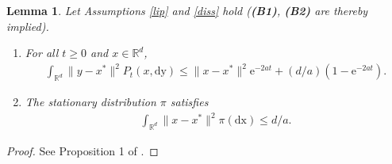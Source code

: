 \documentclass[a4paper]{article}
\newtheorem{lemma}[theorem]{Lemma}
\def\e{\text{e}}
\def\Rd{\mathbb{R}^{d}}
\begin{document}
\begin{lemma}\label{prop2}
	Let Assumptions \ref{lip} and \ref{diss} hold ({\bf (B1)}, {\bf (B2)} are thereby implied).
	\begin{enumerate}
		\item[(i)] For all $t\geq 0$ and $x \in \Rd$,
		\begin{align*}
		\int_{\Rd}\|y-x^*\|^2P_t(x,\mathrm{dy})\leq \|x-x^*\|^2 \e^{-2at}+(d/a)(1-\e^{-2at}).
		\end{align*}
		\item[(ii)] The stationary distribution $\pi$ satisfies
		\begin{align*}
		\int_{\Rd}\|x-x^*\|^2\pi(\mathrm{dx}) \leq d/a.
		\end{align*}
	\end{enumerate}
\end{lemma}
\begin{proof} See Proposition 1 of \cite{durmus-moulines}.
\end{proof}
\end{document}
